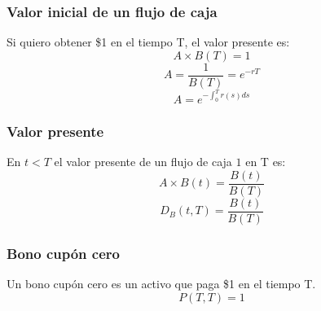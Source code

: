 \begin{frame}
    \frametitle{Valor inicial de un flujo de caja}
    \begin{definition}
        Si quiero obtener \$1 en el tiempo T, el valor presente es:
        \begin{equation*}
            A \times B(T) = 1
        \end{equation*}
        \begin{equation*}
            A = \frac{1}{B(T)} = e^{-rT}
        \end{equation*}
        \begin{equation*}
            A = e^{-\int_0^T r(s)ds}
        \end{equation*}
    \end{definition}
\end{frame}

\begin{frame}
    \frametitle{Valor presente}
    \begin{definition}
        En $t<T$ el valor presente de un flujo de caja $1$ en T es:
        \begin{equation*}
            A \times B(t) = \frac{B(t)}{B(T)}
        \end{equation*}
        \begin{equation*}
           D_B(t,T) = \frac{B(t)}{B(T)}
        \end{equation*}
    \end{definition}
\end{frame}

\begin{frame}
    \frametitle{Bono cupón cero}
    \begin{definition}
        Un bono cupón cero es un activo que paga \$1 en el tiempo T.\\
        \begin{equation*}
            P(T, T) = 1  
        \end{equation*}
    \end{definition}
\end{frame}


